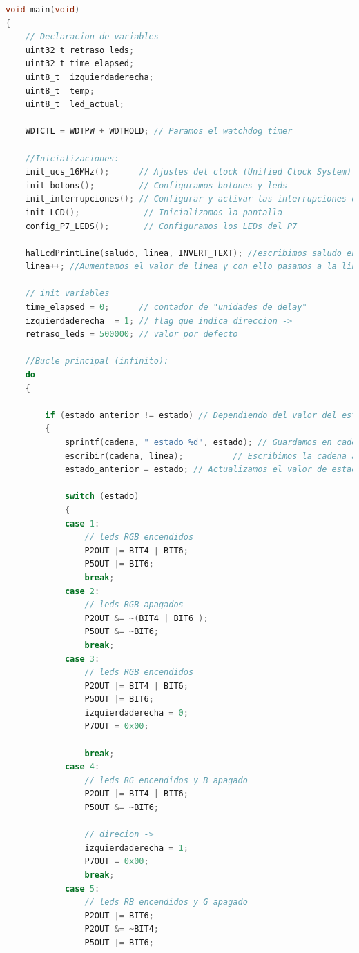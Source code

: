 \documentclass[12pt,a4paper]{article}
\begin{document}
\begin{lstlisting}[language=C]
void main(void)
{
    // Declaracion de variables
    uint32_t retraso_leds;
    uint32_t time_elapsed;
    uint8_t  izquierdaderecha;
    uint8_t  temp;
    uint8_t  led_actual;

    WDTCTL = WDTPW + WDTHOLD; // Paramos el watchdog timer

    //Inicializaciones:
    init_ucs_16MHz();      // Ajustes del clock (Unified Clock System)
    init_botons();         // Configuramos botones y leds
    init_interrupciones(); // Configurar y activar las interrupciones de los botones
    init_LCD();             // Inicializamos la pantalla
    config_P7_LEDS();       // Configuramos los LEDs del P7

    halLcdPrintLine(saludo, linea, INVERT_TEXT); //escribimos saludo en la primera linea
    linea++; //Aumentamos el valor de linea y con ello pasamos a la linea siguiente

    // init variables
    time_elapsed = 0;      // contador de "unidades de delay"
    izquierdaderecha  = 1; // flag que indica direccion ->
    retraso_leds = 500000; // valor por defecto

    //Bucle principal (infinito):
    do
    {

        if (estado_anterior != estado) // Dependiendo del valor del estado se encendera un LED u otro.
        {
            sprintf(cadena, " estado %d", estado); // Guardamos en cadena la siguiente frase: estado "valor del estado"
            escribir(cadena, linea);          // Escribimos la cadena al LCD
            estado_anterior = estado; // Actualizamos el valor de estado_anterior, para que no esta siempre escribiendo.

            switch (estado)
            {
            case 1:
                // leds RGB encendidos
                P2OUT |= BIT4 | BIT6;
                P5OUT |= BIT6;
                break;
            case 2:
                // leds RGB apagados
                P2OUT &= ~(BIT4 | BIT6 );
                P5OUT &= ~BIT6;
                break;
            case 3:
                // leds RGB encendidos
                P2OUT |= BIT4 | BIT6;
                P5OUT |= BIT6;
                izquierdaderecha = 0;
                P7OUT = 0x00;

                break;
            case 4:
                // leds RG encendidos y B apagado
                P2OUT |= BIT4 | BIT6;
                P5OUT &= ~BIT6;

                // direcion ->
                izquierdaderecha = 1;
                P7OUT = 0x00;
                break;
            case 5:
                // leds RB encendidos y G apagado
                P2OUT |= BIT6;
                P2OUT &= ~BIT4;
                P5OUT |= BIT6;


\end{lstlisting}
\end{document}
